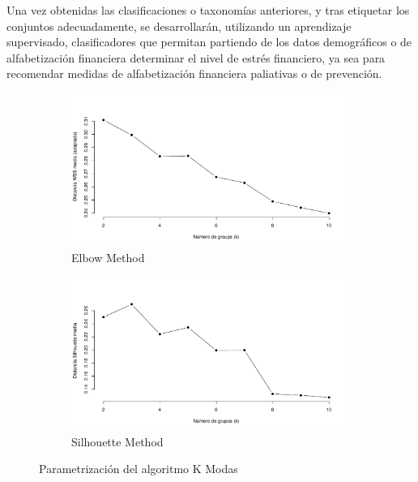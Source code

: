 \documentclass[a4paper, 11pt]{article}
\begin{document}
Una vez obtenidas las clasificaciones o taxonomías anteriores, y tras etiquetar los conjuntos
adecuadamente, se desarrollarán, utilizando un aprendizaje supervisado, clasificadores que 
permitan partiendo de los datos demográficos o de alfabetización financiera determinar el 
nivel de estrés financiero, ya sea para recomendar medidas de alfabetización financiera 
paliativas o de prevención.
\begin{center}    
\begin{figure}[ht]
    \centering
    \begin{subfigure}[t]{0.45\linewidth}
        \centering
        \includegraphics[width=\linewidth]{images/clustering_wss_analysis.pdf}
        \caption{Elbow Method}
        \label{fig:clustering_wss_analysis}
    \end{subfigure}
    \hfill 
    \begin{subfigure}[t]{0.45\linewidth}
        \centering
        \includegraphics[width=\linewidth]{images/clustering_silhouette_analysis.pdf}
        \caption{Silhouette Method}
        \label{fig:clustering_silhouette_analysis}
    \end{subfigure}
    \caption{Parametrización del algoritmo K Modas}
    \label{fig:k-modes-hyperparameters}
    \end{figure}
\end{center}
\end{document}
